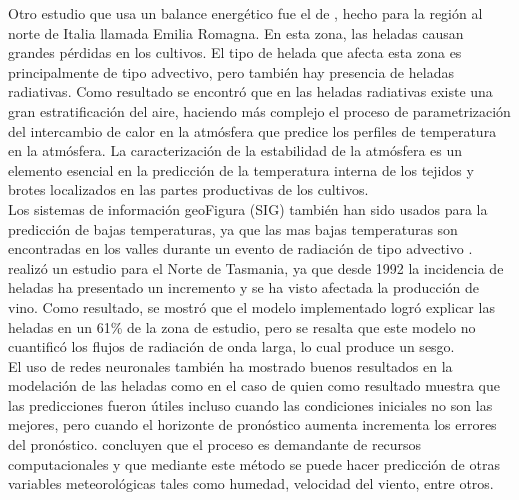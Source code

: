Otro estudio que usa un balance energético fue el de \citet{Rossi2002}, hecho para la región al norte de Italia llamada Emilia Romagna. En esta zona, las heladas causan grandes pérdidas en los cultivos. El tipo de helada que afecta esta zona es principalmente de tipo advectivo, pero también hay presencia de heladas radiativas. Como resultado se encontró que en las heladas radiativas existe una gran estratificación del aire, haciendo más complejo el proceso de parametrización del intercambio de calor en la atmósfera que predice los perfiles de temperatura en la atmósfera. La caracterización de la estabilidad de la atmósfera es un elemento esencial en la predicción de la temperatura interna de los tejidos y brotes localizados en las partes productivas de los cultivos.\\

Los sistemas de información geoFigura (SIG) también han sido usados para la predicción de bajas temperaturas, ya que las mas bajas temperaturas son encontradas en los valles durante un evento de radiación de tipo advectivo \citep{Halley2003, Blennow1998}. \citet{Halley2003} realizó un estudio para el Norte de Tasmania, ya que desde 1992 la incidencia de heladas ha presentado un incremento y se ha visto afectada la producción de vino. Como resultado, se mostró que el modelo implementado logró explicar las heladas en un 61\% de la zona de estudio, pero se resalta que este modelo no cuantificó los flujos de radiación de onda larga, lo cual produce un sesgo.\\

El uso de redes neuronales también ha mostrado buenos resultados en la modelación de las heladas como en el caso de \citet{Smith2007} quien como resultado muestra que las predicciones fueron útiles incluso cuando las condiciones iniciales no son las mejores, pero cuando el horizonte de pronóstico aumenta incrementa los errores del pronóstico. \citet{Abhishek2012} concluyen que el proceso es demandante de recursos computacionales y que mediante este método se puede hacer predicción de otras variables meteorológicas tales como humedad, velocidad del viento, entre otros.\\

